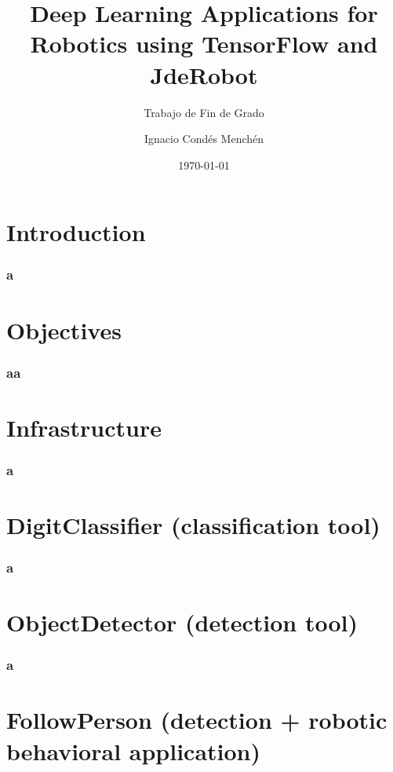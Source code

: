 \documentclass[12pt]{beamer}
\author{Ignacio Condés Menchén}
\title{Deep Learning Applications for Robotics using TensorFlow and JdeRobot}
\subtitle{Trabajo de Fin de Grado}
\institute{Universidad Rey Juan Carlos}
\date{\today}
\begin{document}
	\maketitle
	\section{Introduction}
	\begin{frame}
		\frametitle{a}
	\end{frame}
	
	
	\section{Objectives}
	\begin{frame}
		\frametitle{aa}
	\end{frame}
	
	
	\section{Infrastructure}
	\begin{frame}
		\frametitle{a}
	\end{frame}
	
	
	\section{DigitClassifier (classification tool)}
	\begin{frame}
		\frametitle{a}
	\end{frame}
	
	
	\section{ObjectDetector (detection tool)}
	\begin{frame}
		\frametitle{a}
	\end{frame}
	
	
	\section{FollowPerson (detection + robotic behavioral application)}
	\begin{frame}
		\frametitle{}
	\end{frame}
\end{document}
